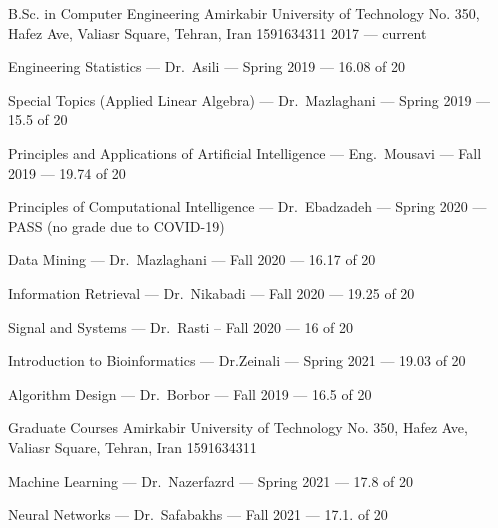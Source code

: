 

\begin{cventries}

  \cventry
    {B.Sc. in Computer Engineering} %
    {Amirkabir University of Technology} %
    {No. 350, Hafez Ave, Valiasr Square, Tehran, Iran 1591634311} %
    {2017 --- current} %
    {
        \begin{cvitems}
            \item Engineering Statistics --- Dr.~Asili --- Spring 2019 --- 16.08 of 20
            \item Special Topics (Applied Linear Algebra) --- Dr.~Mazlaghani --- Spring 2019 --- 15.5 of 20
            \item Principles and Applications of Artificial Intelligence --- Eng.~Mousavi --- Fall 2019 --- 19.74 of 20
            \item Principles of Computational Intelligence --- Dr.~Ebadzadeh --- Spring 2020 --- PASS (no grade due to COVID-19)
            \item Data Mining --- Dr.~Mazlaghani --- Fall 2020 --- 16.17 of 20
            \item Information Retrieval --- Dr.~Nikabadi --- Fall 2020 --- 19.25 of 20
            \item Signal and Systems --- Dr.~Rasti -- Fall 2020 --- 16 of 20
            \item Introduction to Bioinformatics --- Dr.Zeinali --- Spring 2021 --- 19.03 of 20
            \item Algorithm Design --- Dr.~Borbor --- Fall 2019 --- 16.5 of 20
        \end{cvitems}
    }

    \cventry
    {Graduate Courses} %
    {Amirkabir University of Technology} %
    {No. 350, Hafez Ave, Valiasr Square, Tehran, Iran 1591634311} %
    {} %
    {
        \begin{cvitems}
          \item Machine Learning --- Dr.~Nazerfazrd --- Spring 2021 --- 17.8 of 20
          \item Neural Networks --- Dr.~Safabakhs --- Fall 2021 --- 17.1. of 20
        \end{cvitems}
    }

\end{cventries}
